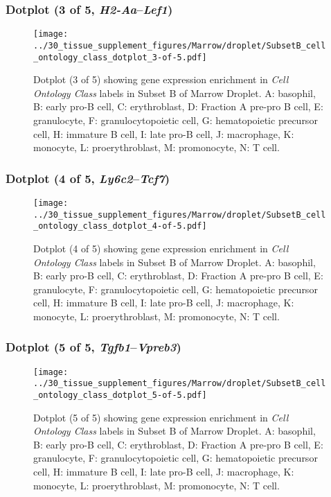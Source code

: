 \clearpage

\subsubsection{Dotplot (3 of 5, \emph{H2-Aa}--\emph{Lef1})}
\begin{figure}[h]
\centering
\texttt{[image: ../30\_tissue\_supplement\_figures/Marrow/droplet/SubsetB\_cell\_ontology\_class\_dotplot\_3-of-5.pdf]}

\caption{ Dotplot (3 of 5)  showing gene expression enrichment in \emph{Cell Ontology Class} labels in Subset B of Marrow Droplet. A: basophil, B: early pro-B cell, C: erythroblast, D: Fraction A pre-pro B cell, E: granulocyte, F: granulocytopoietic cell, G: hematopoietic precursor cell, H: immature B cell, I: late pro-B cell, J: macrophage, K: monocyte, L: proerythroblast, M: promonocyte, N: T cell.}
\end{figure}


\clearpage

\subsubsection{Dotplot (4 of 5, \emph{Ly6c2}--\emph{Tcf7})}
\begin{figure}[h]
\centering
\texttt{[image: ../30\_tissue\_supplement\_figures/Marrow/droplet/SubsetB\_cell\_ontology\_class\_dotplot\_4-of-5.pdf]}

\caption{ Dotplot (4 of 5)  showing gene expression enrichment in \emph{Cell Ontology Class} labels in Subset B of Marrow Droplet. A: basophil, B: early pro-B cell, C: erythroblast, D: Fraction A pre-pro B cell, E: granulocyte, F: granulocytopoietic cell, G: hematopoietic precursor cell, H: immature B cell, I: late pro-B cell, J: macrophage, K: monocyte, L: proerythroblast, M: promonocyte, N: T cell.}
\end{figure}


\clearpage

\subsubsection{Dotplot (5 of 5, \emph{Tgfb1}--\emph{Vpreb3})}
\begin{figure}[h]
\centering
\texttt{[image: ../30\_tissue\_supplement\_figures/Marrow/droplet/SubsetB\_cell\_ontology\_class\_dotplot\_5-of-5.pdf]}

\caption{ Dotplot (5 of 5)  showing gene expression enrichment in \emph{Cell Ontology Class} labels in Subset B of Marrow Droplet. A: basophil, B: early pro-B cell, C: erythroblast, D: Fraction A pre-pro B cell, E: granulocyte, F: granulocytopoietic cell, G: hematopoietic precursor cell, H: immature B cell, I: late pro-B cell, J: macrophage, K: monocyte, L: proerythroblast, M: promonocyte, N: T cell.}
\end{figure}


